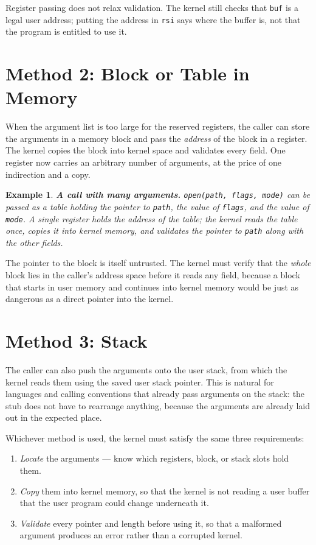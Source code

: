 \documentclass[11pt]{article}
\newtheorem{example}{Example}
\begin{document}
Register passing does not relax validation. The kernel still checks that
\texttt{buf} is a legal user address; putting the address in \texttt{rsi} says
where the buffer is, not that the program is entitled to use it.

\section{Method 2: Block or Table in Memory}

When the argument list is too large for the reserved registers, the caller can
store the arguments in a memory block and pass the \emph{address} of the block
in a register. The kernel copies the block into kernel space and validates
every field. One register now carries an arbitrary number of arguments, at the
price of one indirection and a copy.

\begin{example}
\textbf{A call with many arguments.} \texttt{open(path, flags, mode)} can be
passed as a table holding the pointer to \texttt{path}, the value of
\texttt{flags}, and the value of \texttt{mode}. A single register holds the
address of the table; the kernel reads the table once, copies it into kernel
memory, and validates the pointer to \texttt{path} along with the other fields.
\end{example}

The pointer to the block is itself untrusted. The kernel must verify that the
\emph{whole} block lies in the caller's address space before it reads any field,
because a block that starts in user memory and continues into kernel memory
would be just as dangerous as a direct pointer into the kernel.

\section{Method 3: Stack}

The caller can also push the arguments onto the user stack, from which the
kernel reads them using the saved user stack pointer. This is natural for
languages and calling conventions that already pass arguments on the stack: the
stub does not have to rearrange anything, because the arguments are already
laid out in the expected place.

Whichever method is used, the kernel must satisfy the same three requirements:

\begin{enumerate}
  \item \emph{Locate} the arguments --- know which registers, block, or stack
        slots hold them.
  \item \emph{Copy} them into kernel memory, so that the kernel is not reading
        a user buffer that the user program could change underneath it.
  \item \emph{Validate} every pointer and length before using it, so that a
        malformed argument produces an error rather than a corrupted kernel.
\end{enumerate}
\end{document}
